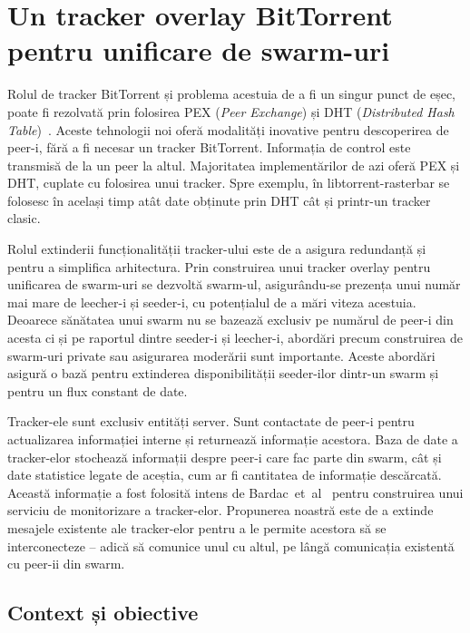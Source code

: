 
\chapter{Un tracker overlay BitTorrent pentru unificare de swarm-uri}
\label{chapter:unified-tracker}

Rolul de tracker BitTorrent și problema acestuia de a fi un singur punct de
eșec, poate fi rezolvată prin folosirea PEX (\textit{Peer Exchange}) și DHT
(\textit{Distributed Hash Table})~\cite{dht-paper}. Aceste tehnologii noi
oferă modalități inovative pentru descoperirea de peer-i, fără a fi necesar un
tracker BitTorrent. Informația de control este transmisă de la un peer la
altul. Majoritatea implementărilor de azi oferă PEX și DHT, cuplate cu
folosirea unui tracker. Spre exemplu, în libtorrent-rasterbar se folosesc în același timp atât date obținute prin DHT cât și printr-un tracker clasic.

Rolul extinderii funcționalității tracker-ului este de a asigura redundanță și pentru a simplifica arhitectura. Prin construirea unui tracker overlay pentru unificarea de swarm-uri se dezvoltă swarm-ul, asigurându-se prezența unui număr mai mare de leecher-i și seeder-i, cu potențialul de a mări viteza acestuia. Deoarece sănătatea unui swarm nu se bazează exclusiv pe numărul de peer-i din acesta ci și pe raportul dintre seeder-i și leecher-i, abordări precum construirea de swarm-uri private sau asigurarea moderării sunt importante. Aceste abordări asigură o bază pentru extinderea disponibilității seeder-ilor dintr-un swarm și pentru un flux constant de date.

Tracker-ele sunt exclusiv entități server. Sunt contactate de peer-i pentru
actualizarea informației interne și returnează informație acestora. Baza de
date a tracker-elor stochează informații despre peer-i care fac parte din
swarm, cât și date statistice legate de aceștia, cum ar fi cantitatea de
informație descărcată. Această informație a fost folosită intens de Bardac~et~al~\cite{tracker-mon} pentru construirea unui serviciu de monitorizare a tracker-elor. Propunerea noastră este de a extinde mesajele existente ale tracker-elor pentru a le permite acestora să se interconecteze -- adică să comunice unul cu altul, pe lângă comunicația existentă cu peer-ii din swarm.

\section{Context și obiective}
\label{sec:unified-tracker:context}

